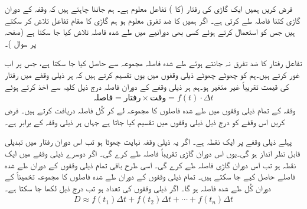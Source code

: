 فرض کریں ہمیں ایک گاڑی کی رفتار (کا ) تفاعل  معلوم ہے۔ ہم جاننا چاہتے ہیں کہ وقفہ    کے دوران  گاڑی کتنا فاصلہ طے کرتی ہے۔ اگر ہمیں  کا ضد تفرق  معلوم ہو   ہم گاڑی کا مقام تفاعل   تلاش کر سکتے ہیں جس کو استعمال کرتے ہوئے کسی بھی دورانیے میں طے شدہ فاصلہ   تلاش کیا جا سکتا ہے (صفحہ  پر سوال )۔

 تفاعل  رفتار  کا ضد تفرق نہ جانتے ہوئے طے شدہ فاصلہ  مجموعہ  سے حاصل کیا جا سکتا ہے،  جس پر اب غور کرتے ہیں۔ہم  کو چھوٹے چھوٹے ذیلی وقفوں میں یوں تقسیم کرتے ہیں کہ ہر ذیلی وقفے میں رفتار کی قیمت تقریباً غیر متغیر ہو۔ہم ہر ذیلی وقفے  کے دوران فاصلہ درج ذیل کلیہ سے اخذ کرتے ہوئے
\begin{align*}
\text{فاصلہ}=\text{رفتار}\times \text{وقت}=f(t)\cdot  \Delta t
\end{align*}
 وقفہ  کے تمام ذیلی وقفوں میں طے شدہ فاصلوں کا مجموعہ لے کر  کُل فاصلہ دریافت کرتے ہیں۔ فرض کریں  اس وقفے  کو درج ذیل ذیلی وقفوں میں تقسیم کیا جاتا ہے جہاں ہر ذیلی وقفہ  کے برابر ہے۔
\begin{center}
\end{center}
پہلے ذیلی وقفے پر  ایک نقطہ ہے۔ اگر یہ ذیلی وقفہ نہایت چھوٹا ہو تب اس دوران رفتار میں تبدیلی قابل نظر انداز ہو گی۔یوں اس دوران گاڑی تقریباً   فاصلہ طے کرے گی۔ اگر  دوسرے ذیلی وقفے میں ایک نقطہ ہو تب اس دوران گاڑی  فاصلہ طے کرے گی۔ اسی طرح باقی تمام ذیلی وقفوں کے دوران طے شدہ فاصلے  حاصل کیے جا سکتے ہیں۔   تمام ذیلی وقفوں کے دوران طے شدہ فاصلوں کا مجموعہ تخمیناً    کے دوران کُل طے شدہ  فاصلہ   ہو گا۔ اگر  ذیلی وقفوں کی تعداد  ہو تب درج ذیل لکھا جا سکتا ہے۔
\begin{align}\label{مساوات_تکمل_طے_شدہ_فاصلہ_عمومی}
D\approx f(t_1)\Delta t+f(t_2)\Delta t+\cdots+f(t_n)\Delta t
\end{align}


